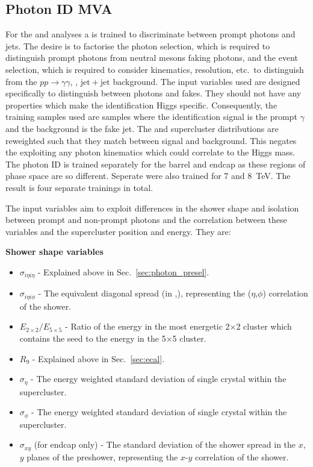 \subsection{Photon ID MVA}
\label{sec:pho_id_mva}

For the \MFM and \SMVA analyses a \BDT is trained to discriminate between prompt photons and jets. The desire is to factorise the photon selection, which is required to distinguish prompt photons from neutral mesons faking photons, and the event selection, which is required to consider kinematics, resolution, etc.~to distinguish \Hgg from the $pp\rightarrow\gamma\gamma$, \gjet, $\mathrm{jet}+\mathrm{jet}$ background. The input variables used are designed specifically to distinguish between photons and fakes. They should not have any properties which make the identification Higgs specific. Consequently, the training samples used are \gjet samples where the identification \BDT signal is the prompt $\gamma$ and the background is the fake jet. The \pT and supercluster \eta distributions are reweighted such that they match between signal and background. This negates the \BDT exploiting any photon kinematics which could correlate to the Higgs mass. The photon ID \BDT is trained separately for the barrel and endcap as these regions of phase space are so different. Seperate \BDTs were also trained for 7 and 8~TeV. The result is four separate trainings in total.

The input variables aim to exploit differences in the shower shape and isolation between prompt and non-prompt photons and the correlation between these variables and the supercluster position and energy. They are:

\noindent\textbf{Shower shape variables}
\begin{itemize}
  \item $\sigma_{i\eta i\eta}$ - Explained above in Sec.~\ref{sec:photon_presel}.
  \item $\sigma_{i\eta i\phi}$ - The equivalent diagonal spread (in \eta,\phi), representing the ($\eta$,$\phi$) correlation of the shower.
  \item $E_{2\times2}/E_{5\times5}$ - Ratio of the energy in the most energetic 2$\times$2 cluster which contains the seed to the energy in the 5$\times$5 cluster.
  \item $R_{9}$ - Explained above in Sec.~\ref{sec:ecal}.
  \item $\sigma_{\eta}$ - The energy weighted standard deviation of single crystal \eta within the supercluster.
  \item $\sigma_{\phi}$ - The energy weighted standard deviation of single crystal \phi within the supercluster.
  \item $\sigma_{xy}$ (for endcap only) - The standard deviation of the shower spread in the $x$, $y$ planes of the preshower, representing the $x$-$y$ correlation of the shower.
\end{itemize}

